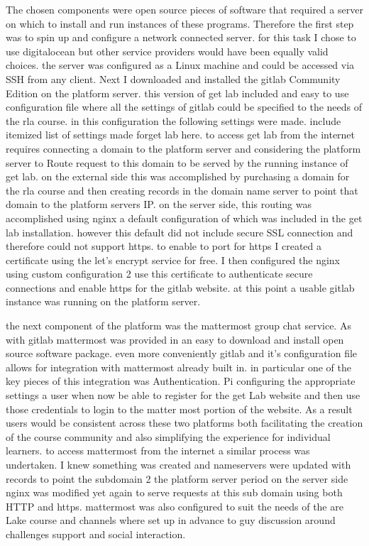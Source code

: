 \documentclass[12pt,twoside,vi]{mitthesis}
\newcommand{\draft}[1]{{\color{blue} #1}}
\begin{document}
\draft{The chosen components were open source pieces of software that required a server on which to install and run instances of these programs. Therefore the first step was to spin up and configure a network connected server. for this task I chose to use digitalocean but other service providers would have been equally valid choices. the server was configured as a Linux machine and could be accessed via SSH from any client. Next I downloaded and installed the gitlab Community Edition on the platform server. this version of get lab included and easy to use configuration file where all the settings of gitlab could be specified to the needs of the rla course. in this configuration the following settings were made. include itemized list of settings made forget lab here. to access get lab from the internet requires connecting a domain to the platform server and considering the platform server to Route request to this domain to be served by the running instance of get lab. on the external side this was accomplished by purchasing a domain for the rla course and then creating records in the domain name server to point that domain to the platform servers IP. on the server side, this routing was accomplished using nginx a default configuration of which was included in the get lab installation. however this default did not include secure SSL connection and therefore could not support https. to enable to port for https I created a certificate using the let's encrypt service for free. I then configured the nginx using custom configuration 2 use this certificate to authenticate secure connections and enable https for the gitlab website. at this point a usable gitlab instance was running on the platform server.

the next component of the platform was the mattermost group chat service. As with gitlab mattermost was provided in an easy to download and install open source software package. even more conveniently gitlab and it's configuration file allows for integration with mattermost already built in. in particular one of the key pieces of this integration was Authentication. Pi configuring the appropriate settings a user when now be able to register for the get Lab website and then use those credentials to login to the matter most portion of the website. As a result users would be consistent across these two platforms both facilitating the creation of the course community and also simplifying the experience for individual learners. to access mattermost from the internet a similar process was undertaken. I knew something was created and nameservers were updated with records to point the subdomain 2 the platform server period on the server side nginx was modified yet again to serve requests at this sub domain using both HTTP and https. mattermost was also configured to suit the needs of the are Lake course and channels where set up in advance to guy discussion around challenges support and social interaction.

}
\end{document}
